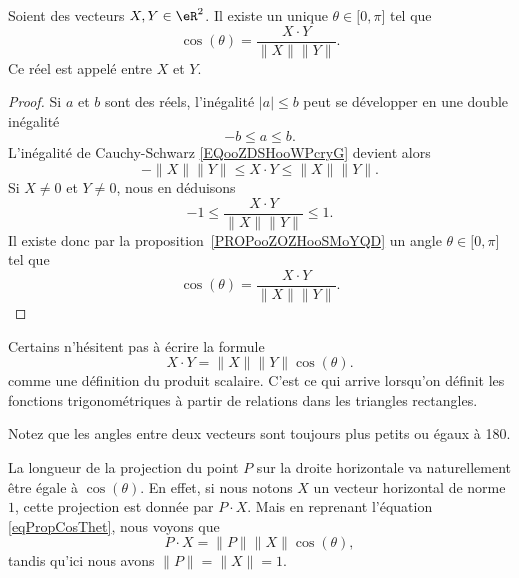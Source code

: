 \begin{propositionDef} \label{DEFooSVDZooPWHwFQ}
	Soient des vecteurs \( X,Y\in \eR^2\). Il existe un unique \( \theta\in \mathopen[ 0 , \pi \mathclose]\) tel que
	\begin{equation}		\label{eqDefAngleVect}
		\cos(\theta)=\frac{ X\cdot Y }{ \| X \|\| Y \| }.
	\end{equation}
	Ce réel est appelé  entre \( X\) et \( Y\).
\end{propositionDef}

\begin{proof}
	Si $a$ et $b$ sont des réels, l'inégalité $| a |\leq b$ peut se développer en une double inégalité
	\begin{equation}
		-b\leq a\leq b.
	\end{equation}
	L'inégalité de Cauchy-Schwarz \eqref{EQooZDSHooWPcryG} devient alors
	\begin{equation}
		-\| X \|\| Y \|\leq X\cdot Y\leq\| X \|\| Y \|.
	\end{equation}
	Si $X\neq 0$ et $Y\neq 0$, nous en déduisons
	\begin{equation}
		-1\leq\frac{ X\cdot Y }{ \| X \|\| Y \| }\leq 1.
	\end{equation}
	Il existe donc par la proposition~\ref{PROPooZOZHooSMoYQD} un angle $\theta\in\mathopen[ 0 , \pi \mathclose]$ tel que
	\begin{equation}
		\cos(\theta)=\frac{ X\cdot Y }{ \| X \|\| Y \| }.
	\end{equation}
\end{proof}

\begin{normaltext}
	Certains n'hésitent pas à écrire la formule
	\begin{equation}		\label{eqPropCosThet}
		X\cdot Y=\| X \|\| Y \|\cos(\theta).
	\end{equation}
	comme une définition du produit scalaire. C'est ce qui arrive lorsqu'on définit les fonctions trigonométriques à partir de relations dans les triangles rectangles.
\end{normaltext}

Notez que les angles entre deux vecteurs sont toujours plus petits ou égaux à \unit{180}{\degree}.

La longueur de la projection du point $P$ sur la droite horizontale va naturellement être égale à $\cos(\theta)$. En effet, si nous notons $X$ un vecteur horizontal de norme $1$, cette projection est donnée par $P\cdot X$. Mais en reprenant l'équation \eqref{eqPropCosThet}, nous voyons que
\begin{equation}
	P\cdot X=\| P \|\| X \|\cos(\theta),
\end{equation}
tandis qu'ici nous avons $\| P \|=\| X \|=1$.

